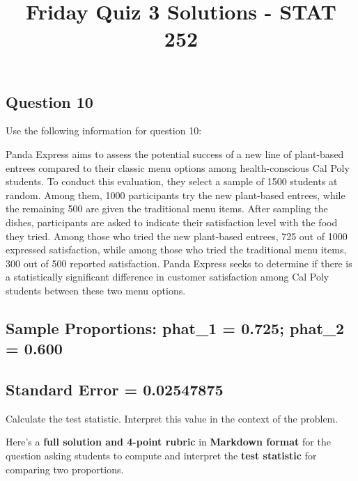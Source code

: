 \documentclass[
  letterpaper,
  DIV=11,
  numbers=noendperiod]{scrartcl}
\title{Friday Quiz 3 Solutions - STAT 252}
\author{}
\date{}
\begin{document}
\maketitle
\ifdefined\Shaded\renewenvironment{Shaded}{\begin{tcolorbox}[borderline west={3pt}{0pt}{shadecolor}, frame hidden, boxrule=0pt, enhanced, breakable, interior hidden, sharp corners]}{\end{tcolorbox}}\fi

\hypertarget{question-10}{%
\subsection{Question 10}\label{question-10}}

Use the following information for question 10:

Panda Express aims to assess the potential success of a new line of
plant-based entrees compared to their classic menu options among
health-conscious Cal Poly students. To conduct this evaluation, they
select a sample of 1500 students at random. Among them, 1000
participants try the new plant-based entrees, while the remaining 500
are given the traditional menu items. After sampling the dishes,
participants are asked to indicate their satisfaction level with the
food they tried. Among those who tried the new plant-based entrees, 725
out of 1000 expressed satisfaction, while among those who tried the
traditional menu items, 300 out of 500 reported satisfaction. Panda
Express seeks to determine if there is a statistically significant
difference in customer satisfaction among Cal Poly students between
these two menu options.

\hypertarget{sample-proportions-phat_1-0.725-phat_2-0.600}{%
\subsection{Sample Proportions: phat\_1 = 0.725; phat\_2 =
0.600}\label{sample-proportions-phat_1-0.725-phat_2-0.600}}

\hypertarget{standard-error-0.02547875}{%
\subsection{Standard Error =
0.02547875}\label{standard-error-0.02547875}}

Calculate the test statistic. Interpret this value in the context of the
problem.

Here's a \textbf{full solution and 4-point rubric} in \textbf{Markdown
format} for the question asking students to compute and interpret the
\textbf{test statistic} for comparing two proportions.
\end{document}
